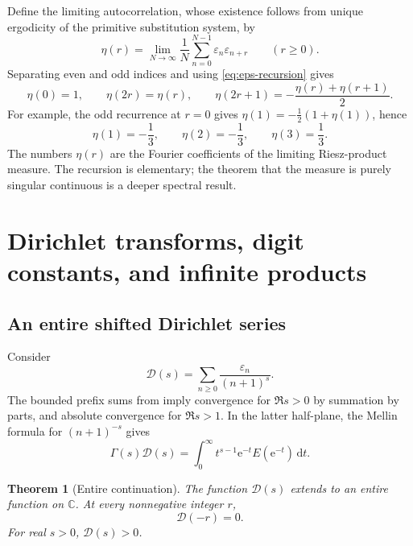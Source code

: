 \documentclass[11pt,oneside]{article}
\newtheorem{theorem}{Theorem}[section]
\theoremstyle{definition}
\theoremstyle{remark}
\newcommand{\C}{\mathbb C}
\newcommand{\e}{\mathrm e}
\newcommand{\dd}{\,\mathrm d}
\newcommand{\eps}{\varepsilon}
\begin{document}
Define the limiting autocorrelation, whose existence follows from unique ergodicity of the
primitive substitution system, by
\begin{equation}
  \eta(r)=\lim_{N\to\infty}\frac1N
  \sum_{n=0}^{N-1}\eps_n\eps_{n+r}\qquad(r\ge0).           \label{eq:autocorrelation-def}
\end{equation}
Separating even and odd indices and using \eqref{eq:eps-recursion} gives
\begin{equation}
  \boxed{
  \eta(0)=1,
  \qquad
  \eta(2r)=\eta(r),
  \qquad
  \eta(2r+1)=-\frac{\eta(r)+\eta(r+1)}2.}                  \label{eq:autocorrelation-recursion}
\end{equation}
For example, the odd recurrence at \(r=0\) gives
\(\eta(1)=-\tfrac12(1+\eta(1))\), hence
\begin{equation}
  \eta(1)=-\frac13,
  \qquad \eta(2)=-\frac13,
  \qquad \eta(3)=\frac13.                                 \label{eq:autocorrelation-first}
\end{equation}
The numbers \(\eta(r)\) are the Fourier coefficients of the limiting Riesz-product measure.
The recursion is elementary; the theorem that the measure is purely singular continuous is
a deeper spectral result.

\section{Dirichlet transforms, digit constants, and infinite products}
\label{sec:analytic}

\subsection{An entire shifted Dirichlet series}

Consider
\begin{equation}
  \mathcal D(s)=\sum_{n\ge0}\frac{\eps_n}{(n+1)^s}.        \label{eq:Dirichlet-definition}
\end{equation}
The bounded prefix sums from  imply convergence for
\(\Re s>0\) by summation by parts, and absolute convergence for \(\Re s>1\).  In the latter
half-plane, the Mellin formula for \((n+1)^{-s}\) gives
\begin{equation}
  \Gamma(s)\mathcal D(s)
   =\int_0^\infty t^{s-1}\e^{-t}E(\e^{-t})\dd t.           \label{eq:Dirichlet-Mellin}
\end{equation}

\begin{theorem}[Entire continuation]
\label{thm:Dirichlet-entire}
The function \(\mathcal D(s)\) extends to an entire function on \(\C\).  At every
nonnegative integer \(r\),
\begin{equation}
  \boxed{\mathcal D(-r)=0.}                                \label{eq:Dirichlet-trivial-zeros}
\end{equation}
For real \(s>0\), \(\mathcal D(s)>0\).
\end{theorem}
\end{document}
